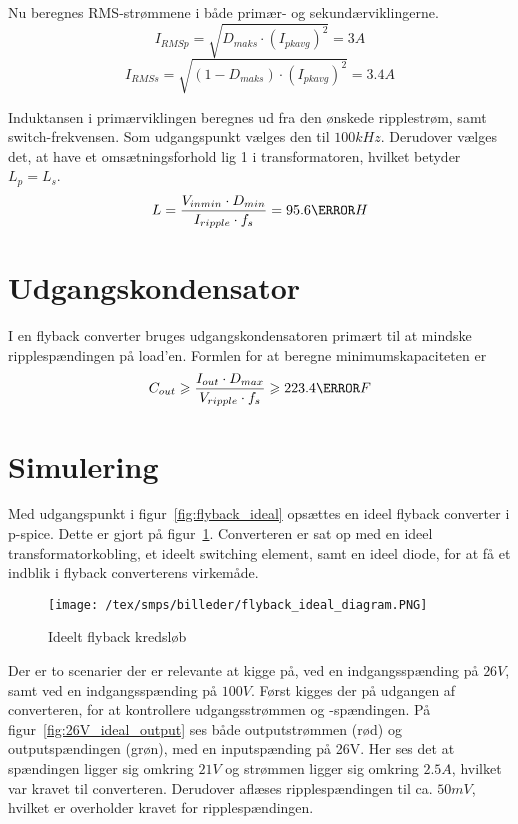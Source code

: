 \noindent Nu beregnes RMS-strømmene i både primær- og sekundærviklingerne. 
\begin{equation} \label{I_p_RMS_CCM}
I_{RMSp} = \sqrt{D_{maks} \cdot (I_{pkavg})^2} = 3A
\end{equation}
\begin{equation} \label{I_s_RMS_CCM}
I_{RMSs} = \sqrt{(1-D_{maks}) \cdot (I_{pkavg})^2} = 3.4A
\end{equation}

Induktansen i primærviklingen beregnes ud fra den ønskede ripplestrøm, samt switch-frekvensen. Som udgangspunkt vælges den til $100kHz$. Derudover vælges det, at have et omsætningsforhold lig 1 i transformatoren, hvilket betyder $L_p = L_s$.
\begin{equation} \label{L}
L = \frac{V_{inmin} \cdot D_{min}}{I_{ripple} \cdot f_s} = 95.6\micro H
\end{equation}



\section{Udgangskondensator}
I en flyback converter bruges udgangskondensatoren primært til at mindske ripplespændingen på load'en. Formlen for at beregne minimumskapaciteten er
\begin{equation} \label{udgangskondensator}
C_{out} \geqslant \frac{I_{out} \cdot D_{max}}{V_{ripple} \cdot f_s} \geqslant 223.4 \micro F
\end{equation}

\section{Simulering}
Med udgangspunkt i figur~\ref{fig:flyback_ideal} opsættes en ideel flyback converter i p-spice. Dette er gjort på figur~\ref{fig:ideal_flyback_diagram}. Converteren er sat op med en ideel transformatorkobling, et ideelt switching element, samt en ideel diode, for at få et indblik i flyback converterens virkemåde. 


\begin{figure}[H]
	\center
	\texttt{[image: /tex/smps/billeder/flyback\_ideal\_diagram.PNG]}
	\caption{Ideelt flyback kredsløb}
	\label{fig:ideal_flyback_diagram}
\end{figure}

Der er to scenarier der er relevante at kigge på, ved en indgangsspænding på $26V$, samt ved en indgangsspænding på $100V$. Først kigges der på udgangen af converteren, for at kontrollere udgangsstrømmen og -spændingen. På figur~\ref{fig:26V_ideal_output} ses både outputstrømmen (rød) og outputspændingen (grøn), med en inputspænding på 26V. Her ses det at spændingen ligger sig omkring $21V$ og strømmen ligger sig omkring $2.5A$, hvilket var kravet til converteren. Derudover aflæses ripplespændingen til ca. $50mV$, hvilket er overholder kravet for ripplespændingen. 

